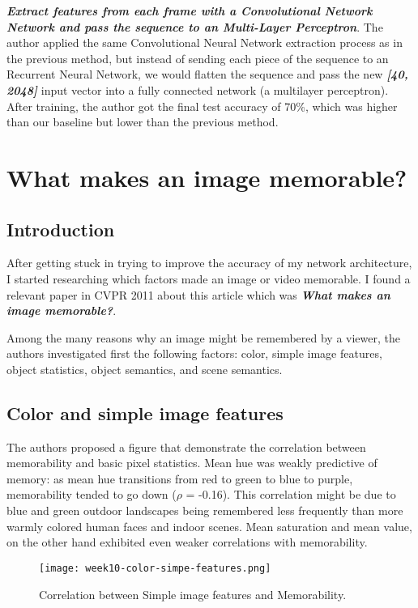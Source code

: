 \textbf{\emph{Extract features from each frame with a Convolutional Network Network and pass the sequence to an Multi-Layer Perceptron}}. The author applied the same Convolutional Neural Network extraction process as in the previous method, but instead of sending each piece of the sequence to an Recurrent Neural Network, we would flatten the sequence and pass the new \textbf{\emph{[40, 2048]}} input vector into a fully connected network (a multilayer perceptron). After training, the author got the final test accuracy of 70\%, which was higher than our baseline but lower than the previous method.

\section{What makes an image memorable?}
\subsection{Introduction}
After getting stuck in trying to improve the accuracy of my network architecture, I started researching which factors made an image or video memorable. I found a relevant paper in CVPR 2011 about this article which was \textbf{\emph{What makes an image memorable?}}\cite{imagememorable}.

Among the many reasons why an image might be remembered by a viewer, the authors investigated first the following factors: color, simple image features, object statistics, object semantics, and scene semantics.

\subsection{Color and simple image features}
The authors proposed a figure that demonstrate the correlation between memorability and basic pixel statistics. Mean hue was weakly predictive of memory: as mean hue transitions from red to green to blue to purple, memorability tended to go down ($\rho$ = -0.16). This correlation might be due to blue and green outdoor landscapes being remembered less frequently than more warmly colored human faces and indoor scenes. Mean saturation and mean value, on the other hand exhibited even weaker correlations with memorability. 

\begin{figure}[!ht]
\centering
\texttt{[image: week10-color-simpe-features.png]}
\caption{Correlation between Simple image features and Memorability.}
\end{figure}

